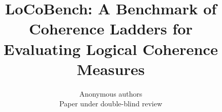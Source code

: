

\newcommand{\tbd}[1]{\textcolor{red}{[#1]}}

\title{LoCoBench: A Benchmark of Coherence Ladders for\\
       Evaluating Logical Coherence Measures}

\author{Anonymous authors\\Paper under double-blind review}


\maketitle

